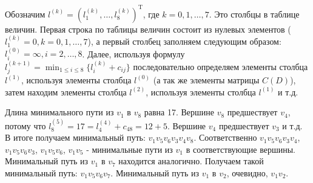 \documentclass[12pt, letterpaper, titlepage]{article}
\begin{document}
Обозначим $l^{(k)}=(l_1^{(k)},\dots,l_8^{(k)})^\mathrm{T}$, где $k=0,1,\dots,7$. Это столбцы в
таблице величин. Первая строка по таблицы величин состоит из нулевых элементов ($l^{(k)}_1=0,k=0,1,\dots,7$),
а первый столбец заполняем следующим образом: $l_i^{(0)}=\infty,i=2,\dots,8$. Далее, используя формулу
$l_j^{(k+1)}=\displaystyle\min_{1\le i\le8}\{l_i^{(k)}+c_{ij}\}$ последовательно определяем элементы столбца
$l^{(1)}$, используя элементы столбца $l^{(0)}$ (а так же элементы матрицы $C(D)$), затем находим элементы
столбца $l^{(2)}$, используя элементы столбца $l^{(1)}$ и т.д.

Длина минимального пути из $v_1$ в $v_8$ равна 17. Вершине $v_8$ предшествует $v_4$, потому что $l^{(5)}_8=17=l^{(4)}_4+c_{48}=12+5$.
Вершине $v_4$ предшествует $v_3$ и т.д. В итоге получаем минимальный путь: $v_1v_5v_6v_3v_4v_8$. Соответственно
$v_1v_5v_6v_3v_4$, $v_1v_5v_6v_3$, $v_1v_5v_6$, $v_1v_5$ - минимальные пути из $v_1$ в соответствующие вершины.
Минимальный путь из $v_1$ в $v_7$ находится аналогично. Получаем такой минимальный путь: $v_1v_5v_6v_7$.
Минимальный путь из $v_1$ в $v_2$, очевидно, $v_1v_2$.
\end{document}
